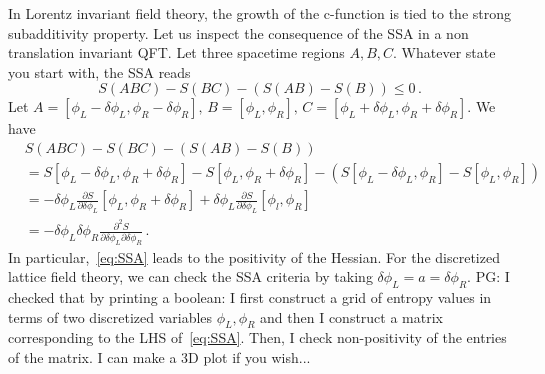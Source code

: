 \documentclass[a4paper]{article}
\newcommand{\purple}[1]{{\color{purple} #1 \color{black}}}
\newcommand{\PG}[1]{{\purple{PG: #1}}} %
\begin{document}
In Lorentz invariant field theory, the growth of the c-function is tied to the strong subadditivity property. Let us inspect the consequence of the SSA in a non translation invariant QFT. Let three spacetime regions $A,B,C$. Whatever state you start with, the SSA reads
\begin{equation}\label{eq:SSA}
  S(ABC)-S(BC)-\left(S(AB)-S(B)\right) \leq 0\,.
\end{equation}
Let $A=[\phi_L-\delta \phi_L, \phi_R - \delta \phi_R],\,B =[\phi_L, \phi_R],\, C=[\phi_L+\delta \phi_L, \phi_R + \delta \phi_R]$.
We have
\begin{equation}
\begin{aligned}
  &S(ABC)-S(BC)-\left(S(AB)-S(B)\right) \\
  &= S[\phi_L-\delta \phi_L, \phi_R + \delta \phi_R] - S[\phi_L, \phi_R + \delta \phi_R] -\left(S[\phi_L- \delta \phi_L, \phi_R]- S[\phi_L, \phi_R]\right)\\
  &=-\delta \phi_L \frac{\partial S}{\partial \delta \phi_L}[\phi_L,\phi_R + \delta \phi_R] + \delta \phi_L \frac{\partial S}{\partial \delta \phi_L}[\phi_l, \phi_R]\\
  &= -\delta \phi_L \delta \phi_R \frac{\partial ^2 S}{\partial \delta \phi_L \partial \delta \phi_R}\,.
\end{aligned}
\end{equation} 
In particular,~\eqref{eq:SSA} leads to the positivity of the Hessian. For the discretized lattice field theory, we can check the SSA criteria by taking $\delta \phi_L = a = \delta \phi_R$. \PG{I checked that by printing a boolean: I first construct a grid of entropy values in terms of two discretized variables $\phi_L, \phi_R$ and then I construct a matrix corresponding to the LHS of~\eqref{eq:SSA}. Then, I check non-positivity of the entries of the matrix. I can make a 3D plot if you wish...}
\end{document}
